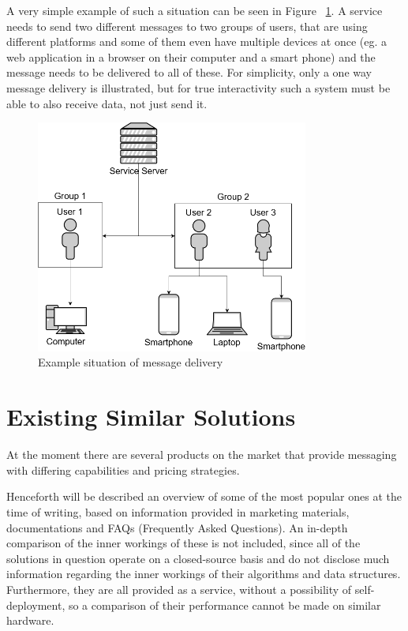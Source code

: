 A very simple example of such a situation can be seen in Figure ~\ref{fig:example-situation}. A service needs to send two different messages to two groups of users, that are using different platforms and some of them even have multiple devices at once (eg. a web application in a browser on their computer and a smart phone) and the message needs to be delivered to all of these. For simplicity, only a one way message delivery is illustrated, but for true interactivity such a system must be able to also receive data, not just send it.

\begin{figure}[H]
	\centering
	\includegraphics[width=0.8\textwidth]{figures/02_analysis/example-situation}
    \caption{Example situation of message delivery}
    \label{fig:example-situation}
\end{figure}

\section{Existing Similar Solutions} \label{sec:similar-solutions}
At the moment there are several products on the market that provide messaging with differing capabilities and pricing strategies.

Henceforth will be described an overview of some of the most popular ones at the time of writing, based on information provided in marketing materials, documentations and FAQs (Frequently Asked Questions). An in-depth comparison of the inner workings of these is not included, since all of the solutions in question operate on a closed-source basis and do not disclose much information regarding the inner workings of their algorithms and data structures. Furthermore, they are all provided as a service, without a possibility of self-deployment, so a comparison of their performance cannot be made on similar hardware.

